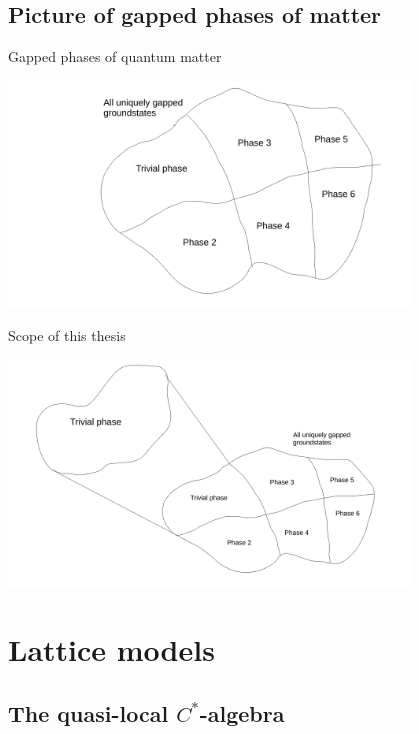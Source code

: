 \documentclass{beamer}
\begin{document}
\subsection{Picture of gapped phases of matter}

\begin{frame}{Gapped phases of quantum matter}
	\begin{center}
		\includegraphics[trim={6cm 0 2.5cm 0},clip,width=0.8\textwidth]{Figures/GappedPhasesOfQuantumMatter.pdf}
	\end{center}
\end{frame}

\begin{frame}{Scope of this thesis}
	\begin{center}
		\includegraphics[trim={1.5cm 0 2cm 0},clip,width=0.8\textwidth]{Figures/TrivialGappedPhaseOfQuantumMatter.pdf}
	\end{center}
\end{frame}

\section{Lattice models}
\subsection{The quasi-local $C^*$-algebra}
\end{document}
